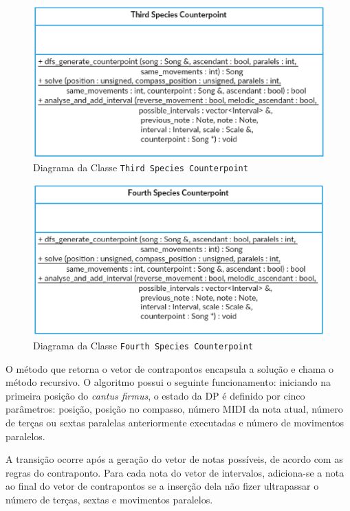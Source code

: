     \begin{figure}[htb]
      \centering
      \includegraphics[scale=0.7]{figuras/thirdspeciescounterpointclass.eps}
      \caption{Diagrama da Classe \texttt{Third Species Counterpoint}}
      \label{thirdspeciescounterpointclass}
    \end{figure}

    \begin{figure}[htb]
      \centering
      \includegraphics[scale=0.7]{figuras/fourthspeciescounterpointclass.eps}
      \caption{Diagrama da Classe \texttt{Fourth Species Counterpoint}}
      \label{fourthspeciescounterpointclass}
    \end{figure}

    O método que retorna o vetor de contrapontos encapsula a solução e chama o método recursivo. O algoritmo possui o seguinte funcionamento: iniciando na primeira posição do \textit{cantus firmus}, o estado da DP é definido por cinco parâmetros: posição, posição no compasso, número MIDI da nota atual, número de terças ou sextas paralelas anteriormente executadas e número de movimentos paralelos.

    A transição ocorre após a geração do vetor de notas possíveis, de acordo com as regras do contraponto. Para cada nota do vetor de intervalos, adiciona-se a nota ao final do vetor de contrapontos se a inserção dela não fizer ultrapassar o número de terças, sextas e movimentos paralelos.

